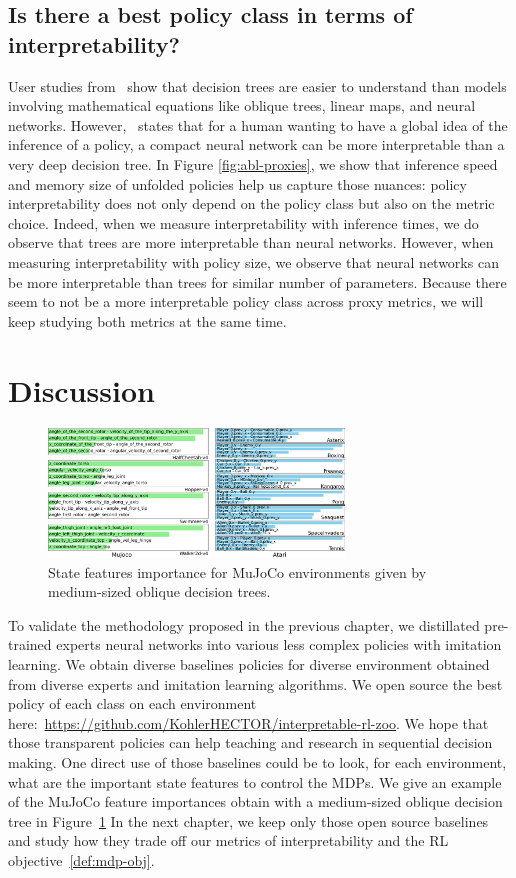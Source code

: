 \subsection{Is there a best policy class in terms of interpretability?}
User studies from~\cite{study-1,study-2,study-3} show that decision trees are easier to understand than models involving mathematical equations like oblique trees, linear maps, and neural networks.
However,~\cite{mythos} states that for a human wanting to have a global idea of the inference of a policy, a compact neural network can be more interpretable than a very deep decision tree.
In Figure \ref{fig:abl-proxies}, we show that inference speed and memory size of unfolded policies help us capture those nuances: policy interpretability does not only depend on the policy class but also on the metric choice.
Indeed, when we measure interpretability with inference times, we do observe that trees are more interpretable than neural networks.
However, when measuring interpretability with policy size, we observe that neural networks can be more interpretable than trees for similar number of parameters.
Because there seem to not be a more interpretable policy class across proxy metrics, we will keep studying both metrics at the same time.

\section{Discussion}
\begin{figure}
  \center
  \includegraphics[trim={0 0 22cm 0},clip,width=0.7\textwidth]{images/images_part3/dis_mujoco+f_atari.pdf}
  \caption{State features importance for MuJoCo environments given by medium-sized oblique decision trees.}\label{fig:mujoco-feat}
\end{figure}
To validate the methodology proposed in the previous chapter, we distillated pre-trained experts neural networks into various less complex policies with imitation learning.
We obtain diverse baselines policies for diverse environment obtained from diverse experts and imitation learning algorithms.
We open source the best policy of each class on each environment here:~\url{https://github.com/KohlerHECTOR/interpretable-rl-zoo}.
We hope that those transparent policies can help teaching and research in sequential decision making.
One direct use of those baselines could be to look, for each environment, what are the important state features to control the MDPs.
We give an example of the MuJoCo feature importances obtain with a medium-sized oblique decision tree in Figure~\ref{fig:mujoco-feat}
In the next chapter, we keep only those open source baselines and study how they trade off our metrics of interpretability and the RL objective~\ref{def:mdp-obj}.

